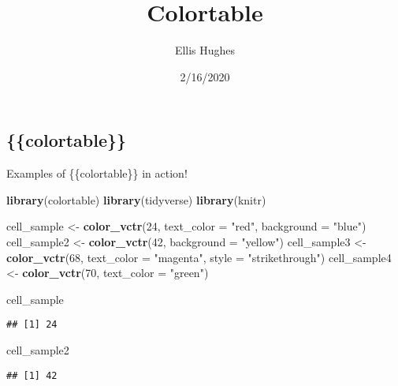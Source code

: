 \documentclass[
]{article}
\title{Colortable}
\author{Ellis Hughes}
\date{2/16/2020}
\newenvironment{Shaded}{\begin{snugshade}}{\end{snugshade}}
\newcommand{\DataTypeTok}[1]{\textcolor[rgb]{0.13,0.29,0.53}{#1}}
\newcommand{\DecValTok}[1]{\textcolor[rgb]{0.00,0.00,0.81}{#1}}
\newcommand{\KeywordTok}[1]{\textcolor[rgb]{0.13,0.29,0.53}{\textbf{#1}}}
\newcommand{\NormalTok}[1]{#1}
\newcommand{\StringTok}[1]{\textcolor[rgb]{0.31,0.60,0.02}{#1}}
\begin{document}
\maketitle

\hypertarget{colortable}{%
\subsection{\{\{colortable\}\}}\label{colortable}}

Examples of \{\{colortable\}\} in action!

\begin{Shaded}
\begin{Highlighting}[]
\KeywordTok{library}\NormalTok{(colortable)}
\KeywordTok{library}\NormalTok{(tidyverse)}
\KeywordTok{library}\NormalTok{(knitr)}
\end{Highlighting}
\end{Shaded}

\begin{Shaded}
\begin{Highlighting}[]
\NormalTok{cell_sample  <-}\StringTok{ }\KeywordTok{color_vctr}\NormalTok{(}\DecValTok{24}\NormalTok{, }\DataTypeTok{text_color =} \StringTok{"red"}\NormalTok{, }\DataTypeTok{background =} \StringTok{"blue"}\NormalTok{)}
\NormalTok{cell_sample2 <-}\StringTok{ }\KeywordTok{color_vctr}\NormalTok{(}\DecValTok{42}\NormalTok{, }\DataTypeTok{background =} \StringTok{"yellow"}\NormalTok{)}
\NormalTok{cell_sample3 <-}\StringTok{ }\KeywordTok{color_vctr}\NormalTok{(}\DecValTok{68}\NormalTok{, }\DataTypeTok{text_color =} \StringTok{"magenta"}\NormalTok{, }\DataTypeTok{style =} \StringTok{"strikethrough"}\NormalTok{)}
\NormalTok{cell_sample4 <-}\StringTok{ }\KeywordTok{color_vctr}\NormalTok{(}\DecValTok{70}\NormalTok{, }\DataTypeTok{text_color =} \StringTok{"green"}\NormalTok{)}

\NormalTok{cell_sample}
\end{Highlighting}
\end{Shaded}

\texttt{\#\#\ [1]\ \colorbox[rgb]{0.0,0.0,1.0}{\textcolor[rgb]{1.0,0.0,0.0}{24}}}\newline

\begin{Shaded}
\begin{Highlighting}[]
\NormalTok{cell_sample2}
\end{Highlighting}
\end{Shaded}

\texttt{\#\#\ [1]\ \colorbox[rgb]{1.0,1.0,0.0}{42}}\newline
\end{document}

